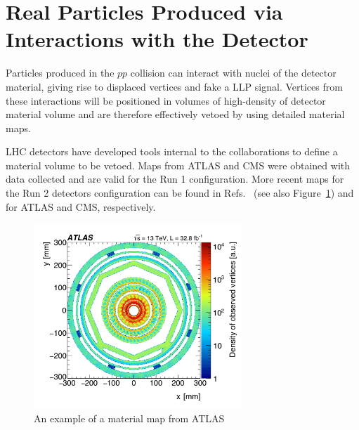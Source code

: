 \section{Real Particles Produced via Interactions with the Detector} %

Particles produced in the $pp$ collision can interact with nuclei of the detector material,  giving rise to displaced vertices and fake a LLP signal. Vertices from these interactions will be positioned in volumes of high-density of detector material volume and are therefore effectively vetoed by using detailed material maps.

LHC detectors have developed tools internal to the collaborations to define a material volume to be vetoed. Maps from ATLAS \cite{Aaboud:2016poq} and CMS \cite{CMS:2010nua}  were obtained with data collected and are valid for the Run 1 configuration. More recent maps for the Run 2 detectors configuration can be found in Refs.~\cite{Aaboud:2017iio} (see also Figure~\ref{fig:materialmaps}) and \cite{CMSmaterial} for ATLAS and CMS, respectively.
%
\begin{figure}[t]
  \centering
  \includegraphics[width=0.7\textwidth]{figures/atlasmaterial.png}
  \caption{An example of a material map from ATLAS~\cite{Aaboud:2017iio}
  }
  \label{fig:materialmaps}
\end{figure}

